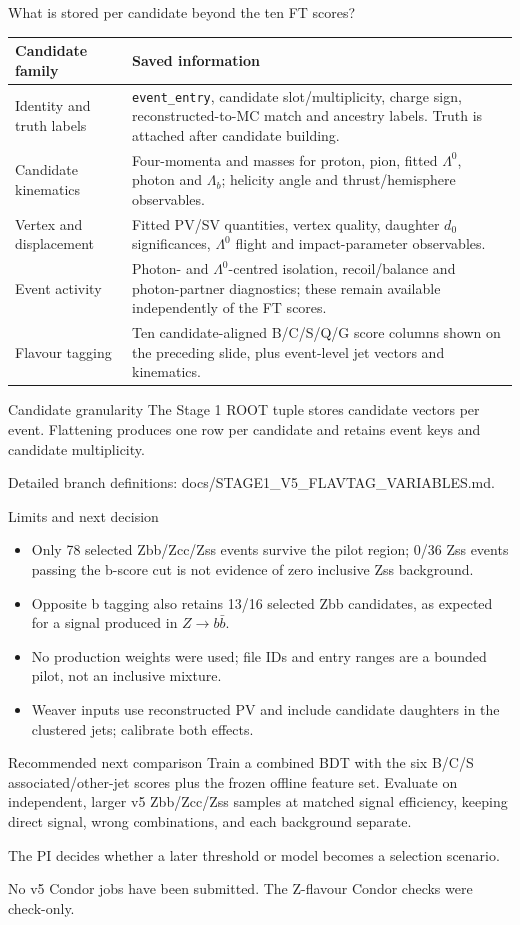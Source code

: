 \documentclass[aspectratio=169,10pt]{beamer}
\newcommand{\tinyref}[1]{\vfill\par{\tiny\color{gray}#1}}
\begin{document}
\begin{frame}{What is stored per candidate beyond the ten FT scores?}
\small
\begin{tabular}{p{}p{}}
\toprule
Candidate family & Saved information\\
\midrule
Identity and truth labels & \texttt{event\_entry}, candidate slot/multiplicity, charge sign, reconstructed-to-MC match and ancestry labels. Truth is attached after candidate building.\\
Candidate kinematics & Four-momenta and masses for proton, pion, fitted $\Lambda^0$, photon and $\Lambda_b$; helicity angle and thrust/hemisphere observables.\\
Vertex and displacement & Fitted PV/SV quantities, vertex quality, daughter $d_0$ significances, $\Lambda^0$ flight and impact-parameter observables.\\
Event activity & Photon- and $\Lambda^0$-centred isolation, recoil/balance and photon-partner diagnostics; these remain available independently of the FT scores.\\
Flavour tagging & Ten candidate-aligned B/C/S/Q/G score columns shown on the preceding slide, plus event-level jet vectors and kinematics.\\
\bottomrule
\end{tabular}
\vspace{0.3cm}
\begin{alertblock}{Candidate granularity}
The Stage 1 ROOT tuple stores candidate vectors per event. Flattening produces one row per candidate and retains event keys and candidate multiplicity.
\end{alertblock}
\tinyref{Detailed branch definitions: docs/STAGE1\_V5\_FLAVTAG\_VARIABLES.md.}
\end{frame}

\begin{frame}{Limits and next decision}
\begin{itemize}
  \item Only 78 selected Zbb/Zcc/Zss events survive the pilot region; 0/36 Zss events passing the b-score cut is not evidence of zero inclusive Zss background.
  \item Opposite b tagging also retains 13/16 selected Zbb candidates, as expected for a signal produced in $Z\to b\bar b$.
  \item No production weights were used; file IDs and entry ranges are a bounded pilot, not an inclusive mixture.
  \item Weaver inputs use reconstructed PV and include candidate daughters in the clustered jets; calibrate both effects.
\end{itemize}
\begin{block}{Recommended next comparison}
Train a combined BDT with the six B/C/S associated/other-jet scores plus the frozen offline feature set. Evaluate on independent, larger v5 Zbb/Zcc/Zss samples at matched signal efficiency, keeping direct signal, wrong combinations, and each background separate.
\end{block}
\centering The PI decides whether a later threshold or model becomes a selection scenario.
\tinyref{No v5 Condor jobs have been submitted. The Z-flavour Condor checks were check-only.}
\end{frame}
\end{document}

